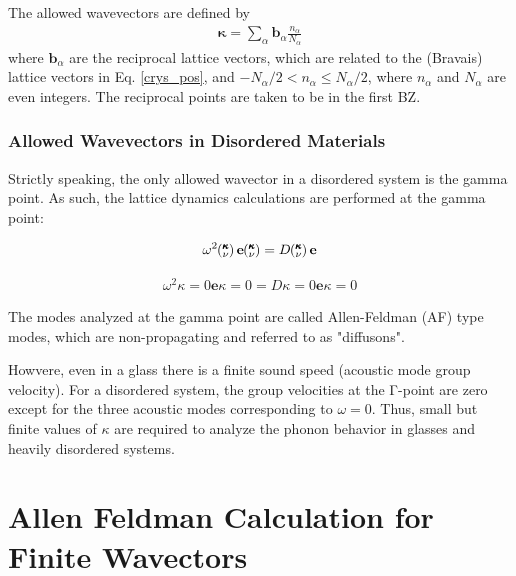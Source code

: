 \documentclass[letterpaper,12pt]{article}
\newcommand{\kv}{\mspace{-4.0mu}\left(\mspace{-8.0mu}\begin{smallmatrix}&\pmb{\kappa} \\&\nu\end{smallmatrix}\mspace{-3.0mu}\right)}
\begin{document}
The allowed wavevectors are defined by
\begin{equation}\label{crys_pos3}
\begin{split}
\pmb{\kappa} = \sum_{\alpha} \mathbf{b}_{\alpha} \frac{n_{\alpha}}{N_{\alpha}}
\end{split}
\end{equation}
where $\mathbf{b}_{\alpha}$ are the reciprocal lattice vectors\cite{ashcroft1976}, which are related to the (Bravais) lattice vectors in Eq$.$ \ref{crys_pos}, and $-N_{\alpha}/2 < n_{\alpha} \leq N_{\alpha}/2$, where $n_{\alpha}$ and $N_{\alpha}$ are even integers.\cite{turney2009a} The reciprocal points are taken to be in the first BZ.\cite{ashcroft1976}


\subsubsection*{Allowed Wavevectors in Disordered Materials}

Strictly speaking, the only allowed wavector in a disordered system is the gamma point. As such, the lattice dynamics calculations are performed at the gamma point:

\begin{equation}\label{crys_pos3}
\begin{split}
\omega^2 \kv \mathbf{e} \kv = D \kv \mathbf{e}
\end{split}
\end{equation}

\begin{equation}\label{crys_pos3}
\begin{split}
\omega^2 \kappa = 0 \mathbf{e} \kappa = 0 = D\kappa = 0  \mathbf{e} \kappa=0
\end{split}
\end{equation}

The modes analyzed at the gamma point are called Allen-Feldman (AF) type modes, which are non-propagating and referred to as "diffusons".

Howvere, even in a glass there is a finite sound speed (acoustic mode group velocity). For a disordered system, the group velocities at the Γ-point are zero except for the three acoustic modes corresponding to $\omega = 0$. Thus, small but finite values of $\kappa$ are required to analyze the phonon behavior in glasses and heavily disordered systems.


\section{\label{S-validation}Allen Feldman Calculation for Finite Wavectors}
\end{document}
